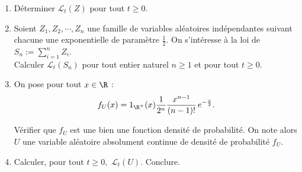 {\begin{enumerate}
\item D\'eterminer $\mathcal{L}_{t}(Z)$ pour tout $t\geq 0$. 
\item Soient $Z_1,Z_2,\cdots{},Z_n$ une famille de variables aléatoires indépendantes suivant chacune une exponentielle de param\`etre $\frac{1}{2}$. On s'int\'eresse \`a la loi de $S_n:=\displaystyle\sum_{i=1}^{n}Z_i$.\\

Calculer $\mathcal{L}_t(S_n)$ pour tout entier naturel $n\geq 1$ et pour tout $t\geq 0$.


\item On pose pour tout $x \in \R$ :
$$f_U(x)=\mathrm{1}_{\R^{+}}(x)\frac{1}{2^n}\frac{x^{n-1}}{(n-1)!}\,e^{-\frac{x}{2}}.$$

V\'erifier que $f_U$ est une bien une fonction densité de probabilité. On note alors $U$ une variable aléatoire absolument continue de densit\'e de probabilit\'e $f_U$.


\item Calculer, pour tout $t\geq 0,$ $\mathcal{L}_t(U)$. Conclure.

\end{enumerate} 

}